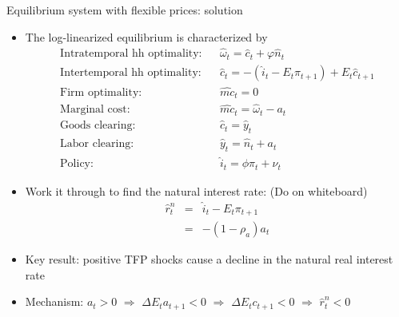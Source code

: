 \documentclass[9pt,xcolor={dvipsnames}]{beamer}
\newcommand{\bit}{\begin{itemize}}
\newcommand{\eit}{\end{itemize}}
\newcommand{\bc}{\color{blue}}
\newcommand{\rc}{\color{red}}
\begin{document}
\begin{frame}{Equilibrium system with flexible prices: solution}

\bit
\setlength\itemsep{1.5em}
\item The log-linearized equilibrium is characterized by
\begin{eqnarray}
\text{Intratemporal hh optimality:} && \hat \omega_t = \hat c_t + \varphi \hat n_t  \nonumber \\
\text{Intertemporal hh optimality:} && \hat c_t =  - (\hat i_t - E_t \pi_{t+1}) + E_t \hat c_{t+1}  \nonumber \\
\text{Firm optimality:} && {\widehat {mc}_t = 0} \nonumber \\
\text{Marginal cost:} && \widehat{mc}_t = \hat \omega_t - a_t \nonumber \\
\text{Goods clearing:} && \hat c_t = \hat y_t \nonumber \\
\text{Labor clearing:} && \hat y_t = \hat n_t + a_t \nonumber \\
\text{Policy:} && \hat i_t = \phi \pi_t + \nu_t \nonumber 
\end{eqnarray}

\item Work it through to find {\bc the natural interest rate}: {\rc (Do on whiteboard)}
\begin{eqnarray}
\hat r^n_t &=& \hat i_t - E_t \pi_{t+1} \nonumber \\
&=& - (1-\rho_a) a_t \nonumber
\end{eqnarray}

\item Key result: positive TFP shocks cause a decline in the natural real interest rate

\item Mechanism: $a_t>0$ $\Rightarrow$ $\Delta E_t a_{t+1} <0$ $\Rightarrow$ $\Delta E_t c_{t+1} <0$ $\Rightarrow$ $ \hat r^n_{t} < 0$

\eit

\end{frame}
\end{document}
